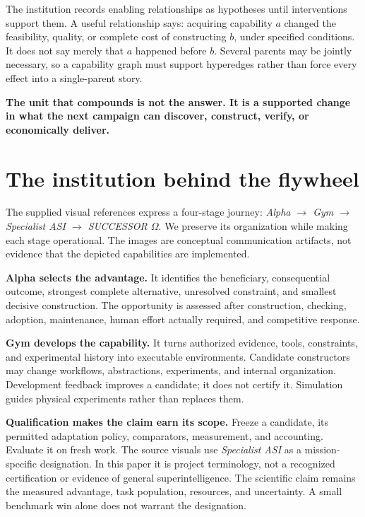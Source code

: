 \documentclass[11pt,letterpaper]{article}
\theoremstyle{remark}\newtheorem{remark}{Remark}[section]
\begin{document}
The institution records enabling relationships as hypotheses until interventions support them. A useful relationship says: acquiring capability $a$ changed the feasibility, quality, or complete cost of constructing $b$, under specified conditions. It does not say merely that $a$ happened before $b$. Several parents may be jointly necessary, so a capability graph must support hyperedges rather than force every effect into a single-parent story.

\begin{thesisbox}
\textbf{The unit that compounds is not the answer. It is a supported change in what the next campaign can discover, construct, verify, or economically deliver.}
\end{thesisbox}

\section{The institution behind the flywheel}
\label{sec:institution}
The supplied visual references express a four-stage journey: \emph{Alpha $\rightarrow$ Gym $\rightarrow$ Specialist ASI $\rightarrow$ SUCCESSOR $\Omega$}. We preserve its organization while making each stage operational. The images are conceptual communication artifacts, not evidence that the depicted capabilities are implemented.

\textbf{Alpha selects the advantage.} It identifies the beneficiary, consequential outcome, strongest complete alternative, unresolved constraint, and smallest decisive construction. The opportunity is assessed after construction, checking, adoption, maintenance, human effort actually required, and competitive response.

\textbf{Gym develops the capability.} It turns authorized evidence, tools, constraints, and experimental history into executable environments. Candidate constructors may change workflows, abstractions, experiments, and internal organization. Development feedback improves a candidate; it does not certify it. Simulation guides physical experiments rather than replaces them.

\textbf{Qualification makes the claim earn its scope.} Freeze a candidate, its permitted adaptation policy, comparators, measurement, and accounting. Evaluate it on fresh work. The source visuals use \emph{Specialist ASI} as a mission-specific designation. In this paper it is project terminology, not a recognized certification or evidence of general superintelligence. The scientific claim remains the measured advantage, task population, resources, and uncertainty. A small benchmark win alone does not warrant the designation.
\end{document}

